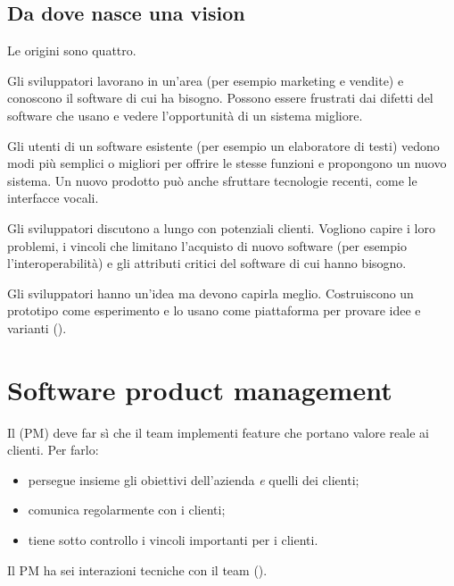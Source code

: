 \subsection*{Da dove nasce una vision}

Le origini sono quattro.

\begin{description}[leftmargin=0pt, style=unboxed]
  \item[Domain experience.] Gli sviluppatori lavorano in un'area (per esempio marketing e vendite) e conoscono il
    software di cui ha bisogno. Possono essere frustrati dai difetti del software che usano e vedere l'opportunità di
    un sistema migliore.
  \item[Product experience.] Gli utenti di un software esistente (per esempio un elaboratore di testi) vedono modi
    più semplici o migliori per offrire le stesse funzioni e propongono un nuovo sistema. Un nuovo prodotto può anche
    sfruttare tecnologie recenti, come le interfacce vocali.
  \item[Customer experience.] Gli sviluppatori discutono a lungo con potenziali clienti. Vogliono capire i loro
    problemi, i vincoli che limitano l'acquisto di nuovo software (per esempio l'interoperabilità) e gli attributi
    critici del software di cui hanno bisogno.
  \item[Prototyping and playing around.] Gli sviluppatori hanno un'idea ma devono capirla meglio. Costruiscono un
    prototipo come esperimento e lo usano come piattaforma per provare idee e varianti ().
\end{description}

\section{Software product management}
\label{sec:prodotti-pm}

Il  (PM) deve far sì che il team implementi feature che portano valore reale ai clienti.
Per farlo:
\begin{itemize}
  \item persegue insieme gli obiettivi dell'azienda \emph{e} quelli dei clienti;
  \item comunica regolarmente con i clienti;
  \item tiene sotto controllo i vincoli importanti per i clienti.
\end{itemize}

Il PM ha sei interazioni tecniche con il team ().

